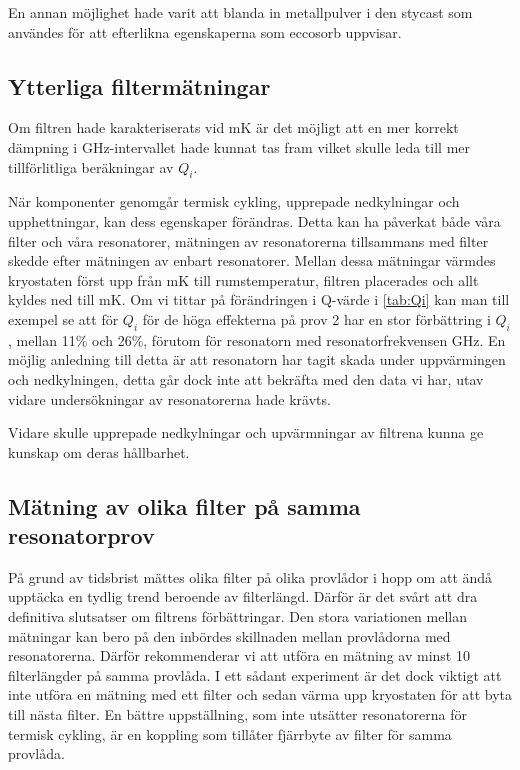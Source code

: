 \documentclass[main.tex]{subfiles}
\begin{document}
En annan möjlighet hade varit att blanda in metallpulver i den stycast som användes för att efterlikna egenskaperna som eccosorb uppvisar. 

\subsection{Ytterliga filtermätningar}
Om filtren hade karakteriserats vid \unit[10]{mK} är det möjligt att en mer korrekt dämpning i \unit[4-8]{GHz}-intervallet hade kunnat tas fram vilket skulle leda till mer tillförlitliga beräkningar av $Q_i$.

När komponenter genomgår termisk cykling, upprepade nedkylningar och upphettningar, kan dess egenskaper förändras. Detta kan ha påverkat både våra filter och våra resonatorer, mätningen av resonatorerna tillsammans med filter skedde efter mätningen av enbart resonatorer. Mellan dessa mätningar värmdes kryostaten först upp från \unit[10]{mK} till rumstemperatur, filtren placerades och allt kyldes ned till \unit[10]{mK}. Om vi tittar på förändringen i Q-värde i \ref{tab:Qi} kan man till exempel se att för $Q_i$ för de höga effekterna på prov 2 har en stor förbättring i $Q_i$, mellan 11\% och 26\%, förutom för resonatorn med resonatorfrekvensen \unit[7,322]{GHz}. En möjlig anledning till detta är att resonatorn har tagit skada under uppvärmingen och nedkylningen, detta går dock inte att bekräfta med den data vi har, utav vidare undersökningar av resonatorerna hade krävts.   



Vidare skulle upprepade nedkylningar och upvärmningar av filtrena kunna ge kunskap om deras hållbarhet.

\subsection{Mätning av olika filter på samma resonatorprov}
På grund av tidsbrist mättes olika filter på olika provlådor i hopp om att ändå upptäcka en tydlig trend beroende av filterlängd. Därför är det svårt att dra definitiva slutsatser om filtrens förbättringar. Den stora variationen mellan mätningar kan bero på den inbördes skillnaden mellan provlådorna med resonatorerna. Därför rekommenderar vi att utföra en mätning av minst 10 filterlängder på samma provlåda. I ett sådant experiment är det dock viktigt att inte utföra en mätning med ett filter och sedan värma upp kryostaten för att byta till nästa filter. En bättre uppställning, som inte utsätter resonatorerna för termisk cykling, är en koppling som tillåter fjärrbyte av filter för samma provlåda.
\end{document}
